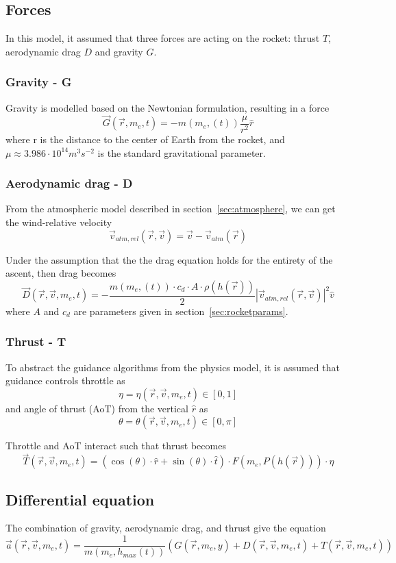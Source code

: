 \documentclass[11pt]{article}
\begin{document}
\subsection{Forces}
In this model, it assumed that three forces are acting on the rocket: thrust $T$, aerodynamic drag $D$ and gravity $G$.

\subsubsection{Gravity - G}
Gravity is modelled based on the Newtonian formulation, resulting in a force
$$
\vec{G}(\vec{r}, m_e, t) = -m(m_e, (t)) \frac{\mu}{r^2} \hat{r} 
$$
where r is the distance to the center of Earth from the rocket, and $\mu \approx 3.986\cdot10^{14} m^3 s^{−2}$ is the standard gravitational parameter.

\subsubsection{Aerodynamic drag - D} \label{sec:drag}

From the atmospheric model described in section~\ref{sec:atmosphere}, we can get the wind-relative velocity
$$
\vec{v}_{atm,rel} (\vec{r}, \vec{v}) = \vec{v} - \vec{v}_{atm} (\vec{r})
$$

Under the assumption that the the drag equation holds for the entirety of the ascent, then drag becomes
$$
\vec{D}(\vec{r}, \vec{v}, m_e, t) = - \frac{ m(m_e, (t)) \cdot  c_d  \cdot A \cdot \rho(h(\vec{r})) }{2} {\left| \vec{v}_{atm,rel} (\vec{r}, \vec{v}) \right|}^2 \hat{v}
$$
where $A$ and $c_d$ are parameters given in section~\ref{sec:rocketparams}.
\subsubsection{Thrust - T}

To abstract the guidance algorithms from the physics model, it is assumed that guidance controls throttle as
$$
\eta = \eta(\vec{r}, \vec{v}, m_e, t)\in[0,1]
$$
and angle of thrust (AoT) from the vertical $\hat{r}$ as
$$
\theta = \theta(\vec{r}, \vec{v}, m_e, t)\in\left[0,\pi\right]
$$

Throttle and AoT interact such that thrust becomes
$$
\vec{T}(\vec{r}, \vec{v}, m_e, t) = \left( \cos ( \theta ) \cdot\hat{r} + \sin ( \theta ) \cdot\hat{t} \right) \cdot F(m_e, P(h(\vec{r}))) \cdot \eta
$$

\subsection{Differential equation}
The combination of gravity, aerodynamic drag, and thrust give the equation
$$
\vec{a}(\vec{r}, \vec{v}, m_e, t) = \frac{1}{m(m_e, h_{max}(t))} \left( G(\vec{r}, m_e, y) + D(\vec{r}, \vec{v}, m_e, t) + T(\vec{r}, \vec{v}, m_e, t) \right)
$$
\end{document}
